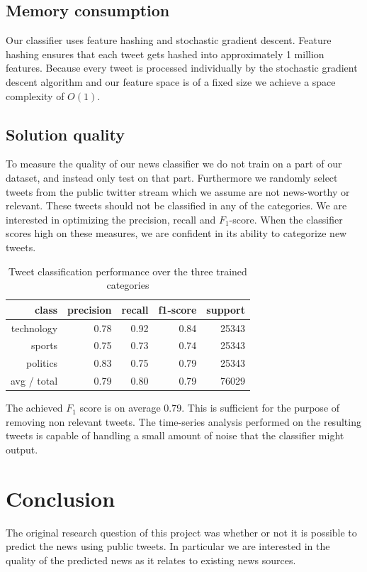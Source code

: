 \documentclass{llncs}
\begin{document}
\subsection{Memory consumption}
Our classifier uses feature hashing and stochastic gradient descent. Feature hashing ensures that each tweet gets hashed into approximately 1 million features. Because every tweet is processed individually by the stochastic gradient descent algorithm and our feature space is of a fixed size we achieve a space complexity of $O(1)$.

\subsection{Solution quality}
To measure the quality of our news classifier we do not train on a part of our dataset, and instead only test on that part. Furthermore we randomly select tweets from the public twitter stream which we assume are not news-worthy or relevant. These tweets should not be classified in any of the categories. We are interested in optimizing the precision, recall and $F_1$-score. When the classifier scores high on these measures, we are confident in its ability to categorize new tweets.

\begin{table}[H]
	\begin{center}
		\begin{tabular}{|r|r|r|r|r|} \hline
			class  & precision   & recall & f1-score  & support \\ \hline
			technology    &   0.78 &     0.92  &    0.84   &  25343 \\
			sports   &    0.75   &   0.73   &   0.74   &   25343 \\
			politics   &    0.83  &    0.75   &   0.79   &   25343 \\
			avg / total  &     0.79   &   0.80  &    0.79   &  76029 \\ \hline
		\end{tabular}
	\end{center}
	\caption{Tweet classification performance over the three trained categories}
	\label{tbl:newclassifier}
\end{table}

The achieved $F_1$ score is on average 0.79. This is sufficient for the purpose of removing non relevant tweets. The time-series analysis performed on the resulting tweets is capable of handling a small amount of noise that the classifier might output.

\section{Conclusion}
The original research question of this project was whether or not it is possible to predict the news using public tweets. In particular we are interested in the quality of the predicted news as it relates to existing news sources.
\end{document}
